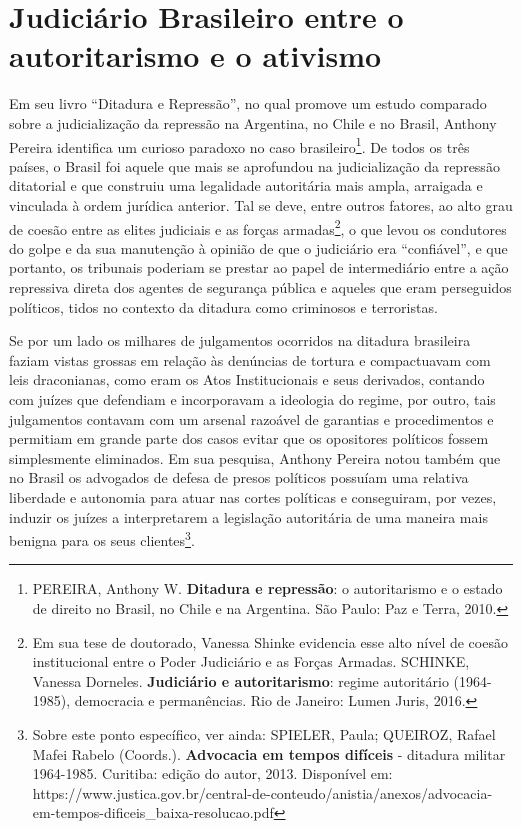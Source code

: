 \section{Judiciário Brasileiro entre o autoritarismo e o ativismo}

Em seu livro ``Ditadura e Repressão'', no qual promove um estudo
comparado sobre a judicialização da repressão na Argentina, no Chile e
no Brasil, Anthony Pereira identifica um curioso paradoxo no caso
brasileiro\footnote{PEREIRA, Anthony W. \textbf{Ditadura e repressão}: o
  autoritarismo e o estado de direito no Brasil, no Chile e na
  Argentina. São Paulo: Paz e Terra, 2010.}. De todos os três países, o
Brasil foi aquele que mais se aprofundou na judicialização da repressão
ditatorial e que construiu uma legalidade autoritária mais ampla,
arraigada e vinculada à ordem jurídica anterior. Tal se deve, entre
outros fatores, ao alto grau de coesão entre as elites judiciais e as
forças armadas\footnote{Em sua tese de doutorado, Vanessa Shinke
  evidencia esse alto nível de coesão institucional entre o Poder
  Judiciário e as Forças Armadas. SCHINKE, Vanessa Dorneles.
  \textbf{Judiciário e autoritarismo}: regime autoritário (1964-1985),
  democracia e permanências. Rio de Janeiro: Lumen Juris, 2016.}, o que
levou os condutores do golpe e da sua manutenção à opinião de que o
judiciário era ``confiável'', e que portanto, os tribunais poderiam se
prestar ao papel de intermediário entre a ação repressiva direta dos
agentes de segurança pública e aqueles que eram perseguidos políticos,
tidos no contexto da ditadura como criminosos e terroristas.

Se por um lado os milhares de julgamentos ocorridos na ditadura
brasileira faziam vistas grossas em relação às denúncias de tortura e
compactuavam com leis draconianas, como eram os Atos Institucionais e
seus derivados, contando com juízes que defendiam e incorporavam a
ideologia do regime, por outro, tais julgamentos contavam com um arsenal
razoável de garantias e procedimentos e permitiam em grande parte dos
casos evitar que os opositores políticos fossem simplesmente eliminados.
Em sua pesquisa, Anthony Pereira notou também que no Brasil os advogados
de defesa de presos políticos possuíam uma relativa liberdade e
autonomia para atuar nas cortes políticas e conseguiram, por vezes,
induzir os juízes a interpretarem a legislação autoritária de uma
maneira mais benigna para os seus clientes\footnote{Sobre este ponto
  específico, ver ainda: SPIELER, Paula; QUEIROZ, Rafael Mafei Rabelo
  (Coords.). \textbf{Advocacia em tempos difíceis} - ditadura militar
  1964-1985. Curitiba: edição do autor, 2013. Disponível em:
  https://www.justica.gov.br/central-de-conteudo/anistia/anexos/advocacia-em-tempos-dificeis\_baixa-resolucao.pdf}.

